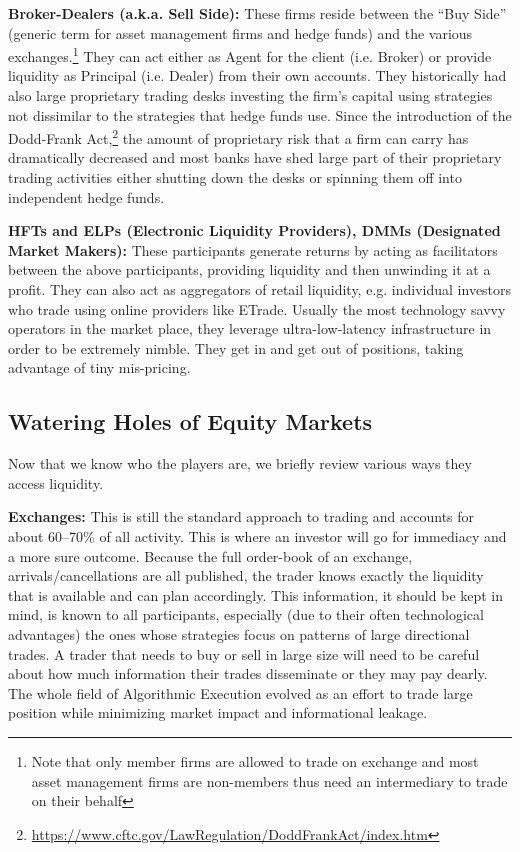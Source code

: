 \pagebreak



\noindent\textbf{Broker-Dealers (a.k.a. Sell Side):} These firms reside between the ``Buy Side'' (generic term for asset management firms and hedge funds) and the various exchanges.\footnote{Note that only member firms are allowed to trade on exchange and most asset management firms are non-members thus need an intermediary to trade on their behalf} They can act either as Agent for the client (i.e. Broker) or provide liquidity as Principal (i.e. Dealer) from their own accounts. They historically had  also large proprietary trading desks investing the firm's capital using strategies not dissimilar to the strategies that hedge funds use. Since the introduction of the Dodd-Frank Act,\footnote{\url{https://www.cftc.gov/LawRegulation/DoddFrankAct/index.htm}} the amount of proprietary risk that a firm can carry has dramatically decreased and most banks have shed large part of their proprietary trading activities either shutting down the desks or spinning them off into independent hedge funds. \twomedskip


\noindent\textbf{HFTs and ELPs (Electronic Liquidity Providers), DMMs (Designated Market Makers):} These participants generate returns by acting as facilitators between the above participants, providing liquidity and then unwinding it at a profit. They can also act as aggregators of retail liquidity, e.g. individual investors who trade using online providers like ETrade. Usually the most technology savvy operators in the market place, they leverage ultra-low-latency infrastructure in order to be extremely nimble. They get in and get out of positions, taking advantage of tiny mis-pricing. 



\subsection{Watering Holes of Equity Markets\label{sec:watering}}

Now that we know who the players are, we briefly review various ways they access liquidity. \twomedskip

\noindent\textbf{Exchanges:} This is still the standard approach to trading and accounts for about 60--70\% of all activity. This is where an investor will go for immediacy and a more sure outcome. Because the full order-book of an exchange, arrivals/cancellations are all published, the trader knows exactly the liquidity that is available and can plan accordingly. This information, it should be kept in mind, is known to all participants, especially (due to their often technological advantages) the ones whose strategies focus on patterns of large directional trades. A trader that needs to buy or sell in large size will need to be careful about how much information their trades disseminate or they may pay dearly. The whole field of Algorithmic Execution evolved as an effort to trade large position while minimizing market impact and informational leakage.


